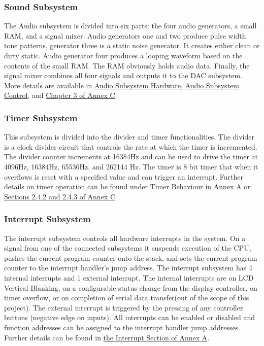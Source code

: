 \documentclass[12pt,letterpaper,titlepage, final]{report}
\begin{document}
\begin{raggedright}
\subsubsection{Sound Subsystem}

The Audio subsystem is divided into six parts: the four audio generators, a small RAM, and a signal mixer. Audio generators one and two produce pulse width tone patterns, generator three is a static noise generator. It creates either clean or dirty static. Audio generator four produces a looping waveform based on the contents of the small RAM. The RAM obviously holds audio data. Finally, the signal mixer combines all four signals and outputs it to the DAC subsystem. More details are available in \hyperlink{soundhardware}{Audio Subsystem Hardware}, \hyperlink{soundcontrol}{Audio Subsystem Control}, and \hyperlink{page.87}{Chapter 3 of Annex C}.

\clearpage

\subsubsection{Timer Subsystem}
This subsystem is divided into the divider and timer functionalities. The divider is a clock divider circuit that controls the rate at which the timer is incremented. The divider counter increments at 16384Hz and can be used to drive the timer at 4096Hz, 16384Hz, 65536Hz, and 262144 Hz. The timer is 8 bit timer that when it overflows is reset with a specified value and can trigger an interrupt. Further details on timer operation can be found under \hyperlink{timer}{Timer Behaviour in Annex A} or \hyperlink{page.35}{Sections 2.4.2 and 2.4.3 of Annex C}

\subsubsection{Interrupt Subsystem}
The interrupt subsystem controls all hardware interrupts in the system. On a signal from one of the connected subsystems it suspends execution of the CPU, pushes the current program counter onto the stack, and sets the current program counter to the interrupt handler's jump address. The interrupt subsystem has 4 internal interrupts and 1 external interrupt. The internal interrupts are on LCD Vertical Blanking, on a configurable status change from the display controller, on timer overflow, or on completion of serial data transfer(out of the scope of this project). The external interrupt is triggered by the pressing of any controller buttons (negative edge on inputs). All interrupts can be enabled or disabled and function addresses can be assigned to the interrupt handler jump addresses. Further details can be found in \hyperlink{interrupt}{the Interrupt Section of Annex A}.


\end{raggedright}
\end{document}
